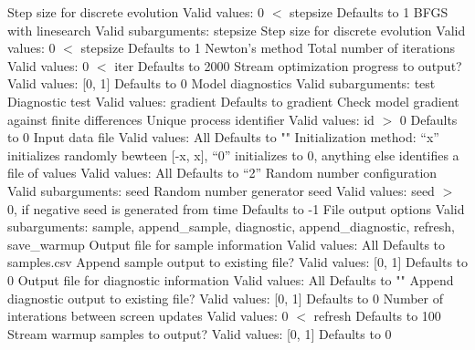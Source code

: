 \begin{description}
          {Step size for discrete evolution}
          {Valid values: 0 $<$ stepsize}
          {Defaults to 1}
%
        {BFGS with linesearch}
        {Valid subarguments: stepsize}
%
          {Step size for discrete evolution}
          {Valid values: 0 $<$ stepsize}
          {Defaults to 1}
%
        {Newton's method}
%
      {Total number of iterations}
      {Valid values: 0 $<$ iter}
      {Defaults to 2000}
%
      {Stream optimization progress to output?}
      {Valid values: [0, 1]}
      {Defaults to 0}
%
    {Model diagnostics}
    {Valid subarguments: test}
%
      {Diagnostic test}
      {Valid values: gradient}
      {Defaults to gradient}
%
        {Check model gradient against finite differences}
%
  {Unique process identifier}
  {Valid values: id $>$ 0}
  {Defaults to 0}
%
  {Input data file}
  {Valid values: All}
  {Defaults to ""}
%
  {Initialization method: ``x'' initializes randomly bewteen [-x, x], ``0'' initializes to 0, anything else identifies a file of values}
  {Valid values: All}
  {Defaults to ``2''}
%
  {Random number configuration}
  {Valid subarguments: seed}
%
    {Random number generator seed}
    {Valid values: seed $>$ 0, if negative seed is generated from time}
    {Defaults to -1}
%
  {File output options}
  {Valid subarguments: sample, append\_sample, diagnostic, append\_diagnostic, refresh, save\_warmup}
%
    {Output file for sample information}
    {Valid values: All}
    {Defaults to samples.csv}
%
    {Append sample output to existing file?}
    {Valid values: [0, 1]}
    {Defaults to 0}
%
    {Output file for diagnostic information}
    {Valid values: All}
    {Defaults to ""}
%
    {Append diagnostic output to existing file?}
    {Valid values: [0, 1]}
    {Defaults to 0}
%
    {Number of interations between screen updates}
    {Valid values: 0 $<$ refresh}
    {Defaults to 100}
%
    {Stream warmup samples to output?}
    {Valid values: [0, 1]}
    {Defaults to 0}
%
\end{description}

